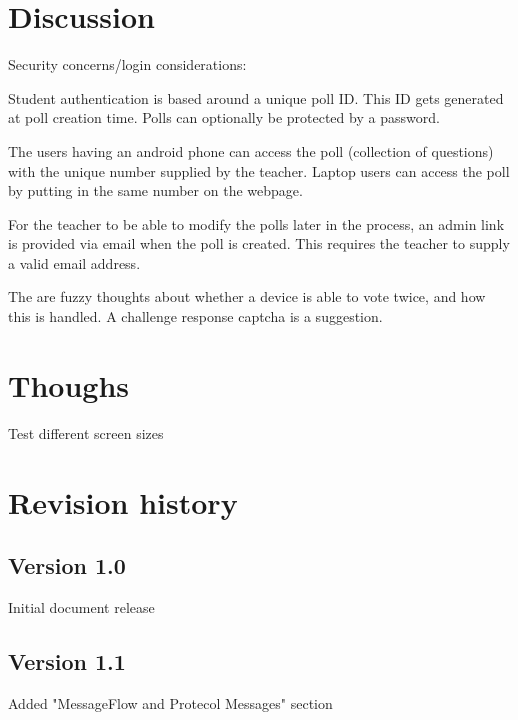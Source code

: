 \documentclass{acm_proc_article-sp}
\begin{document}
\section{Discussion}
\thispagestyle{fancy}%

Security concerns/login considerations:

Student authentication is based around a unique poll ID. This ID gets generated at poll creation time. Polls can optionally be protected by a password.

The users having an android phone can access the poll (collection of questions) with the unique number supplied by the teacher. Laptop users can access the poll by putting in the same number on the webpage.

For the teacher to be able to modify the polls later in the process, an admin link is provided via email when the poll is created. This requires the teacher to supply a valid email address.

The are fuzzy thoughts about whether a device is able to vote twice, and how this is handled. A challenge response captcha is a suggestion.


\appendix

\section{Thoughs}
Test different screen sizes

\section{Revision history}
\subsection{Version 1.0}
Initial document release
\subsection{Version 1.1}
Added "MessageFlow and Protecol Messages" section
\end{document}
